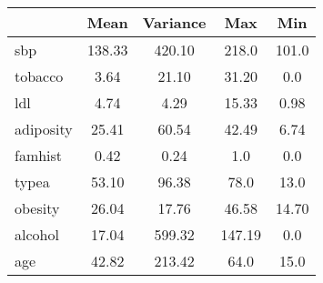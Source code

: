 
\begin{longtable}{lcccc}
\hline
 & Mean & Variance & Max & Min \\ \hline
sbp	& 138.33 & 420.10 & 218.0 & 101.0 \\ 
tobacco	& 3.64 & 21.10 & 31.20 & 0.0 \\ 
ldl	&  4.74 & 4.29 & 15.33 & 0.98 \\ 
adiposity & 25.41 & 60.54 & 42.49 & 6.74 \\
famhist & 0.42 & 0.24 & 1.0 & 0.0 \\
typea	& 53.10 & 96.38 & 78.0 & 13.0 \\
obesity & 26.04 & 17.76 & 46.58 & 14.70 \\
alcohol	& 17.04 & 599.32 & 147.19 & 0.0 \\
age	& 42.82 & 213.42 & 64.0 & 15.0 \\ \hline
\end{longtable}
